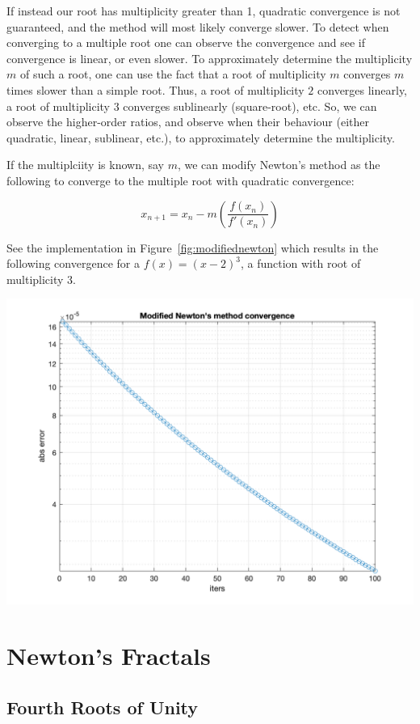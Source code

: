 \documentclass[11pt]{article}
\begin{document}
If instead our root has multiplicity greater than 1, quadratic convergence is not guaranteed, and the method will most likely converge slower. To detect when converging to a multiple root one can observe the convergence and see if convergence is linear, or even slower. To approximately determine the multiplicity $m$ of such a root, one can use the fact that a root of multiplicity $m$ converges $m$ times slower than a simple root. Thus, a root of multiplicity $2$ converges linearly, a root of multiplicity $3$ converges sublinearly (square-root), etc. So, we can observe the higher-order ratios, and observe when their behaviour (either quadratic, linear, sublinear, etc.), to approximately determine the multiplicity.

If the multiplciity is known, say $m$, we can modify Newton's method as the following to converge to the multiple root with quadratic convergence:

$$
x_{n + 1} = x_n - m\left(\frac{f(x_n)}{f'(x_n)}\right)
$$

See the implementation in Figure~\ref{fig:modifiednewton} which results in the following convergence for a $f(x) = (x - 2)^3$, a function with root of multiplicity 3.

\begin{center}
  \includegraphics[width=0.7\linewidth]{modifiednewton.png}
\end{center}

\section{Newton's Fractals}

\subsection{Fourth Roots of Unity}
\end{document}
